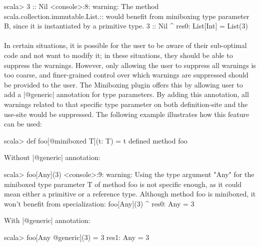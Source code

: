 \begin{lstlisting-nobreak}
scala> 3 :: Nil
<console>:8: warning: The method scala.collection.immutable.List.::
would benefit from miniboxing type parameter B, since it is 
instantiated by a primitive type.
              3 :: Nil
                ^
res0: List[Int] = List(3)
\end{lstlisting-nobreak}

\paragraph{}
In certain situations, it is possible for the user to be aware of their sub-optimal code and not want to modify it; in these situations, they should be able to suppress the warnings. However, only allowing the user to suppress all warnings is too coarse, and finer-grained control over which warnings are suppressed should be provided to the user. The Miniboxing plugin offers this by allowing user to add a |@generic| annotation for type parameters. By adding this annotation, all warnings related to that specific type parameter on both definition-site and the use-site would be suppressed. The following example illustrates how this feature can be used: 

\begin{lstlisting-nobreak}
scala> def foo[@miniboxed T](t: T) = t
defined method foo
\end{lstlisting-nobreak}
Without |@generic| annotation: 

\begin{lstlisting-nobreak}
scala> foo[Any](3)
<console>:9: warning: Using the type argument "Any" for the miniboxed type parameter T of method foo is not specific enough, as it could mean either a primitive or a reference type. Although method foo is miniboxed, it won't benefit from specialization:
              foo[Any](3)
                 ^
res0: Any = 3
\end{lstlisting-nobreak}
With |@generic| annotation: 

\begin{lstlisting-nobreak}
scala> foo[Any @generic](3) = 3
res1: Any = 3
\end{lstlisting-nobreak}

